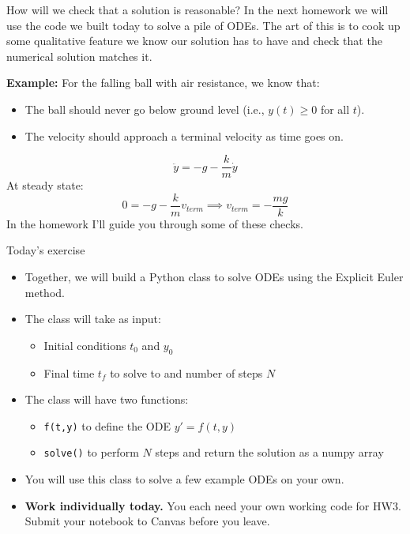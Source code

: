 \documentclass{beamer}
\begin{document}
  \begin{frame}{How will we check that a solution is reasonable?}
    In the next homework we will use the code we built today to solve a pile of ODEs. The art of this is to cook up some qualitative feature we know our solution has to have and check that the numerical solution matches it. 

    \textbf{Example:} For the falling ball with air resistance, we know that:
    \begin{itemize}
      \item The ball should never go below ground level (i.e., \(y(t) \geq 0\) for all \(t\)).
      \item The velocity should approach a terminal velocity as time goes on.
    \end{itemize}
    $$ \ddot{y} = -g - \frac{k}{m}\dot{y} $$
    At steady state:
    $$ 0 = -g - \frac{k}{m}v_{term} \implies v_{term} = -\frac{mg}{k} $$
    In the homework I'll guide you through some of these checks.
\end{frame}

\begin{frame}{Today's exercise}
  \begin{itemize}
    \item Together, we will build a Python class to solve ODEs using the Explicit Euler method.
    \item The class will take as input:
      \begin{itemize}
        \item Initial conditions \(t_0\) and \(y_0\)
        \item Final time \(t_f\) to solve to and number of steps \(N\)
      \end{itemize}
      \item The class will have two functions:
      \begin{itemize}
          \item \texttt{f(t,y)} to define the ODE \(y' = f(t,y)\)
          \item \texttt{solve()} to perform \(N\) steps and return the solution as a numpy array
      \end{itemize}
    \item   You will use this class to solve a few example ODEs on your own.
    \item \textbf{Work individually today.} You each need your own working code for HW3. Submit your notebook to Canvas before you leave.
  \end{itemize}
\end{frame}
\end{document}
